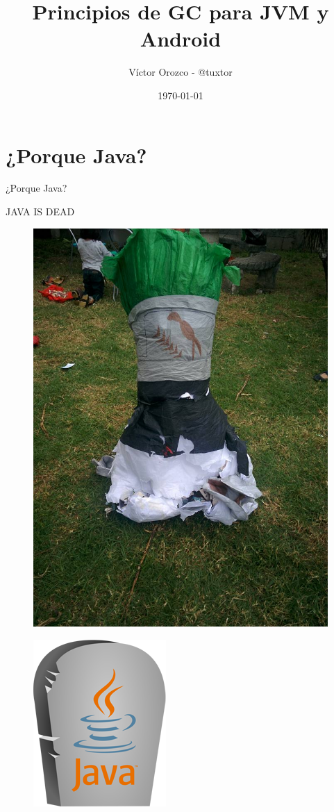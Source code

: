 \documentclass{beamer}
\title{Principios de GC para JVM y Android}
\author{Víctor Orozco - @tuxtor}
\institute{GuateJUG}
\date{\today}
\begin{document}
\frame{\titlepage}


\section{¿Porque Java?}
\begin{frame}
\huge ¿Porque Java?
\end{frame}

\begin{frame}
JAVA IS DEAD
\begin{figure}
\centering
\includegraphics[width=0.5\linewidth]{Images/dukedead.jpg}
\end{figure}
\end{frame}

\begin{frame}
\begin{figure}
\centering
\includegraphics[width=0.5\linewidth]{Images/javadead}
\end{figure}
\end{frame}
\end{document}
